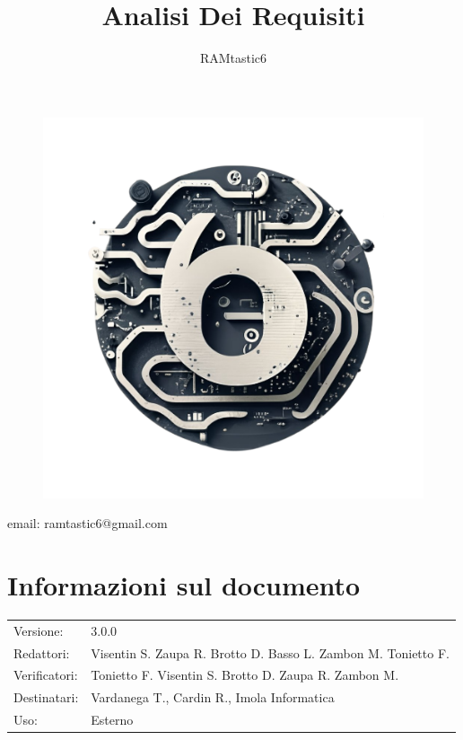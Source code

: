 \documentclass[12pt, oneside]{article}
\author{RAMtastic6}
\begin{document}
\thispagestyle{empty}
\title{Analisi Dei Requisiti}
\maketitle
\begin{figure}[h]
  \centering
  \includegraphics[scale=0.3]{logo.png}
\end{figure}
\begin{center}
    email: ramtastic6@gmail.com
\end{center}

\section*{Informazioni sul documento} 
\begin{tabular}{ll}
Versione: & 3.0.0 \\
Redattori: &  Visentin S.  Zaupa R. Brotto D. Basso L. Zambon M. Tonietto F. \\ 
Verificatori: & Tonietto F. Visentin S. Brotto D. Zaupa R. Zambon M.\\
Destinatari: & Vardanega T., Cardin R., Imola Informatica \\
Uso: & Esterno
\end{tabular}
\newpage
\end{document}
